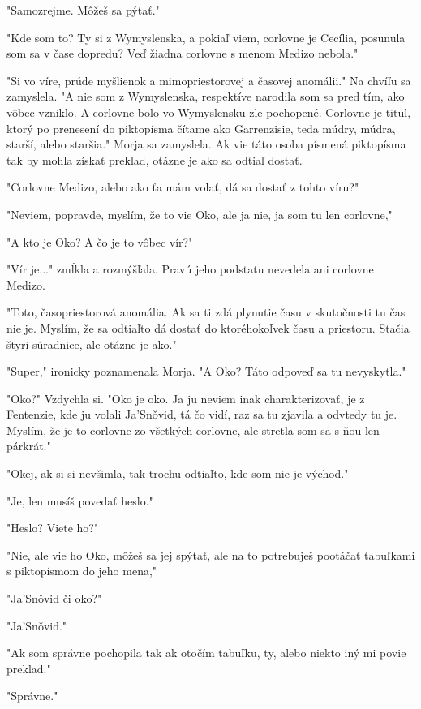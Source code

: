 \documentclass{book}
\begin{document}
"$ $Samozrejme. Môžeš sa pýtať."

"$ $Kde som to? Ty si z Wymyslenska, a pokiaľ viem, corlovne je Cecília, posunula som sa v čase dopredu? Veď žiadna corlovne s menom Medizo nebola."

"$ $Si vo víre, prúde myšlienok a mimopriestorovej a časovej anomálii."$ $ Na chvíľu sa zamyslela. "$ $A nie som z Wymyslenska, respektíve narodila som sa pred tím, ako vôbec vzniklo. A corlovne bolo vo Wymyslensku zle pochopené. Corlovne je titul, ktorý po prenesení do piktopísma čítame ako Garrenzisie, teda múdry, múdra, starší, alebo staršia."$ $ Morja sa zamyslela. Ak vie táto osoba písmená piktopísma tak by mohla získať preklad, otázne je ako sa odtiaľ dostať.

"$ $Corlovne Medizo, alebo ako ťa mám volať, dá sa dostať z tohto víru?"

"$ $Neviem, popravde, myslím, že to vie Oko, ale ja nie, ja som tu len corlovne,"

"$ $A kto je Oko? A čo je to vôbec vír?"

"$ $Vír je..."$ $ zmĺkla a rozmýšľala. Pravú jeho podstatu nevedela ani corlovne Medizo.

"$ $Toto, časopriestorová anomália. Ak sa ti zdá plynutie času v skutočnosti tu čas nie je. Myslím, že sa odtiaľto dá dostať do ktoréhokoľvek času a priestoru. Stačia štyri súradnice, ale otázne je ako."

"$ $Super,"$ $ ironicky poznamenala Morja. "$ $A Oko? Táto odpoveď sa tu nevyskytla."

"$ $Oko?"$ $ Vzdychla si. "$ $Oko je oko. Ja ju neviem inak charakterizovať, je z Fentenzie, kde ju volali Ja'Sno\v{}vid, tá čo vidí, raz sa tu zjavila a odvtedy tu je. Myslím, že je to corlovne zo všetkých corlovne, ale stretla som sa s ňou len párkrát."

"$ $Okej, ak si si nevšimla, tak trochu odtiaľto, kde som nie je východ."

"$ $Je, len musíš povedať heslo."

"$ $Heslo? Viete ho?"

"$ $Nie, ale vie ho Oko, môžeš sa jej spýtať, ale na to potrebuješ pootáčať tabuľkami s piktopísmom do jeho mena,"

"$ $Ja'Sno\v{}vid či oko?"

"$ $Ja'Sno\v{}vid."

"$ $Ak som správne pochopila tak ak otočím tabuľku, ty, alebo niekto iný mi povie preklad."

"$ $Správne."
\end{document}
